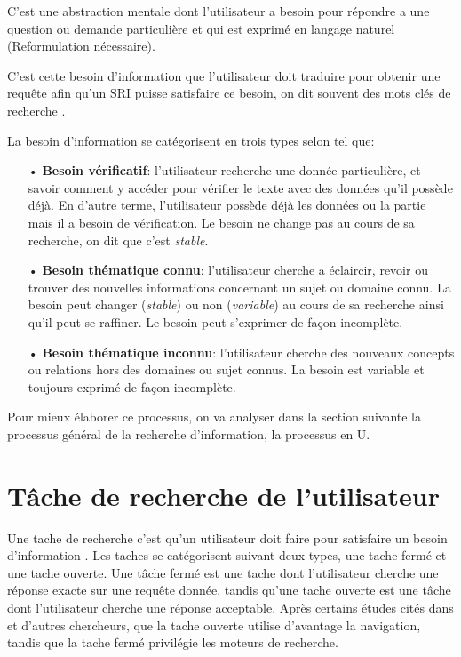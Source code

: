 \begin{definition}
    C'est une abstraction mentale dont l'utilisateur a besoin pour répondre a une question ou demande particulière et qui est exprimé en langage naturel \citep{amelioration-ri-approche-semantique} (Reformulation nécessaire).
\end{definition}

C'est cette besoin d'information que l'utilisateur doit traduire pour obtenir une requête afin qu'un SRI puisse satisfaire ce besoin, on dit souvent des mots clés de recherche \citep{modern-ir}.

La besoin d'information se catégorisent en trois types selon \citeauthor{paradis:tel-00005009} \citep{paradis:tel-00005009} tel que:
\begin{itemize}
    \item[•] \textbf{Besoin vérificatif}: l'utilisateur recherche une donnée particulière, et savoir comment y accéder pour vérifier le texte avec des données qu'il possède déjà. En d'autre terme, l'utilisateur possède déjà les données ou la partie mais il a besoin de vérification. Le besoin ne change pas au cours de sa recherche, on dit que c'est \textit{stable}.
    \item[•] \textbf{Besoin thématique connu}: l'utilisateur cherche a éclaircir, revoir ou trouver des nouvelles informations concernant un sujet ou domaine connu. La besoin peut changer (\textit{stable}) ou non (\textit{variable}) au cours de sa recherche ainsi qu'il peut se raffiner. Le besoin peut s'exprimer de façon incomplète.
    \item[•] \textbf{Besoin thématique inconnu}: l'utilisateur cherche des nouveaux concepts ou relations hors des domaines ou sujet connus. La besoin est variable et toujours exprimé de façon incomplète.
\end{itemize}

Pour mieux élaborer ce processus, on va analyser dans la section suivante la processus général de la recherche d'information, la processus en U.

\section{Tâche de recherche de l'utilisateur}
Une tache de recherche c'est qu'un utilisateur doit faire pour satisfaire un besoin d'information \citep*{boubee-tricot-2010,ri-sur-le-web}.
Les taches se catégorisent suivant deux types, une tache fermé et une tache ouverte. Une tâche fermé est une tache dont l'utilisateur cherche une réponse exacte sur une requête donnée, tandis qu'une tache ouverte est une tâche dont l'utilisateur cherche une réponse acceptable. Après certains études cités dans \citep{ri-sur-le-web} et d'autres chercheurs, que la tache ouverte utilise d'avantage la navigation, tandis que la tache fermé privilégie les moteurs de recherche.

